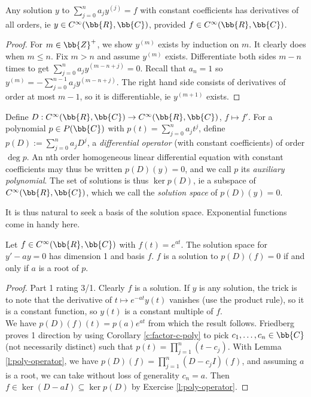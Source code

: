 \begin{lem}
Any solution $y$ to $\sum_{j=0}^na_jy^{(j)}=f$ with constant coefficients has derivatives of all orders, ie $y \in C^\infty(\bb{R},\bb{C})$, provided $f \in C^\infty(\bb{R},\bb{C})$.
\end{lem}
\begin{proof}%
For $m \in \bb{Z}^+$, we show $y^{(m)}$ exists by induction on $m$. It clearly does when $m \leq n$. Fix $m>n$ and assume $y^{(m)}$ exists. Differentiate both sides $m-n$ times to get $\sum_{j=0}^na_jy^{(m-n+j)}=0$. Recall that $a_n=1$ so $y^{(m)}=- \sum_{j=0}^{n-1}a_jy^{(m-n+j)}$. The right hand side consists of derivatives of order at most $m-1$, so it is differentiable, ie $y^{(m+1)}$ exists.
\end{proof}
\begin{defn}
Define $D:C^\infty(\bb{R},\bb{C}) \to C^\infty(\bb{R},\bb{C})$, $f \mapsto f'$. For a polynomial $p \in P(\bb{C})$ with $p(t)=\sum_{j=0}^na_jt^j$, define $p(D):= \sum_{j=0}^na_jD^j$, a \emph{differential operator} (with constant coefficients) of order $\deg p$. An nth order homogeneous linear differential equation with constant coefficients may thus be written $p(D)(y)=0$, and we call $p$ its \emph{auxiliary polynomial}. The set of solutions is thus $\ker p(D)$, ie a subspace of $C^\infty(\bb{R},\bb{C})$, which we call the \emph{solution space} of $p(D)(y)=0$.
\end{defn}
It is thus natural to seek a basis of the solution space. Exponential functions come in handy here.
\begin{lem}\label{l:diff-eq-dim1}
Let $f \in C^\infty(\bb{R},\bb{C})$ with $f(t)=e^{at}$. The solution space for $y'-ay=0$ has dimension 1 and basis $f$.
$f$ is a solution to $p(D)(f)=0$ if and only if $a$ is a root of $p$.
\end{lem}
\begin{proof}
Part 1 rating 3/1. Clearly $f$ is a solution. If $y$ is any solution, the trick is to note that the derivative of $t \mapsto e^{-at}y(t)$ vanishes (use the product rule), so it is a constant function, so $y(t)$ is a constant multiple of $f$.\\
We have $p(D)(f)(t)=p(a)e^{at}$ from which the result follows. Friedberg proves 1 direction by using Corollary \ref{c:factor-c-poly} to pick $c_1, \ldots,c_n \in \bb{C}$ (not necessarily distinct) such that $p(t)= \prod_{j=1}^n(t-c_j)$. With Lemma \ref{l:poly-operator}, we have $p(D)(f)= \prod_{j=1}^n(D-c_jI)(f)$, and assuming $a$ is a root, we can take without loss of generality $c_n=a$. Then $f \in \ker (D-aI) \subseteq \ker p(D)$ by Exercise \ref{l:poly-operator}.
\end{proof}
